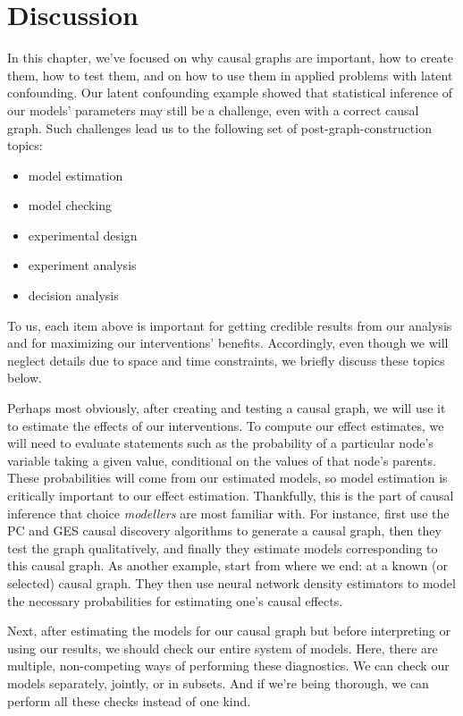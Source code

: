 \section{Discussion}
\label{sec:discussion}

In this chapter, we've focused on why causal graphs are important, how to create them, how to test them, and on how to use them in applied problems with latent confounding.
Our latent confounding example showed that statistical inference of our models' parameters may still be a challenge, even with a correct causal graph.
Such challenges lead us to the following set of post-graph-construction topics:
\begin{itemize}
   \item model estimation
   \item model checking
   \item experimental design
   \item experiment analysis
   \item decision analysis
\end{itemize}
To us, each item above is important for getting credible results from our analysis and for maximizing our interventions' benefits.
Accordingly, even though we will neglect details due to space and time constraints, we briefly discuss these topics below.

Perhaps most obviously, after creating and testing a causal graph, we will use it to estimate the effects of our interventions.
To compute our effect estimates, we will need to evaluate statements such as the probability of a particular node's variable taking a given value, conditional on the values of that node's parents.
These probabilities will come from our estimated models, so model estimation is critically important to our effect estimation.
Thankfully, this is the part of causal inference that choice \textit{modellers} are most familiar with.
For instance, \citet{kostic_2020_uncovering} first use the PC and GES causal discovery algorithms to generate a causal graph, then they test the graph qualitatively, and finally they estimate models corresponding to this causal graph.
As another example, \citet{garrido_2020_estimating} start from where we end: at a known (or selected) causal graph.
They then use neural network density estimators to model the necessary probabilities for estimating one's causal effects.

Next, after estimating the models for our causal graph but before interpreting or using our results, we should check our entire system of models.
Here, there are multiple, non-competing ways of performing these diagnostics.
We can check our models separately, jointly, or in subsets.
And if we're being thorough, we can perform all these checks instead of one kind.

